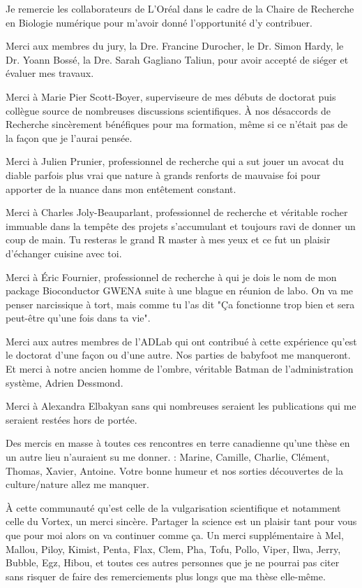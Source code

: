 Je remercie les collaborateurs de L'Oréal dans le cadre de la Chaire de Recherche en Biologie numérique pour m'avoir donné l'opportunité d'y contribuer.

Merci aux membres du jury, la Dre. Francine Durocher, le Dr. Simon Hardy, le Dr. Yoann Bossé, la Dre. Sarah Gagliano Taliun, pour avoir accepté de siéger et évaluer mes travaux.

Merci à Marie Pier Scott-Boyer, superviseure de mes débuts de doctorat puis collègue source de nombreuses discussions scientifiques. À nos désaccords de Recherche sincèrement bénéfiques pour ma formation, même si ce n'était pas de la façon que je l'aurai pensée.

Merci à Julien Prunier, professionnel de recherche qui a sut jouer un avocat du diable parfois plus vrai que nature à grands renforts de mauvaise foi pour apporter de la nuance dans mon entêtement constant. 

Merci à Charles Joly-Beauparlant, professionnel de recherche et véritable rocher immuable dans la tempête des projets s'accumulant et toujours ravi de donner un coup de main. Tu resteras le grand R master à mes yeux et ce fut un plaisir d'échanger cuisine avec toi.

Merci à Éric Fournier, professionnel de recherche à qui je dois le nom de mon package Bioconductor GWENA suite à une blague en réunion de labo. On va me penser narcissique à tort, mais comme tu l'as dit "Ça fonctionne trop bien et sera peut-être qu'une fois dans ta vie".

Merci aux autres membres de l'ADLab qui ont contribué à cette expérience qu'est le doctorat d'une façon ou d'une autre. Nos parties de babyfoot me manqueront. Et merci à notre ancien homme de l'ombre, véritable Batman de l'administration système, Adrien Dessmond.

Merci à Alexandra Elbakyan sans qui nombreuses seraient les publications qui me seraient restées hors de portée.

Des mercis en masse à toutes ces rencontres en terre canadienne qu'une thèse en un autre lieu n'auraient su me donner. : Marine, Camille, Charlie, Clément, Thomas, Xavier, Antoine. Votre bonne humeur et nos sorties découvertes de la culture/nature allez me manquer.

À cette communauté qu'est celle de la vulgarisation scientifique et notamment celle du Vortex, un merci sincère. Partager la science est un plaisir tant pour vous que pour moi alors on va continuer comme ça. Un merci supplémentaire à Mel, Mallou, Piloy, Kimist, Penta, Flax, Clem, Pha, Tofu, Pollo, Viper, Ilwa, Jerry, Bubble, Egz, Hibou, et toutes ces autres personnes que je ne pourrai pas citer sans risquer de faire des remerciements plus longs que ma thèse elle-même.

